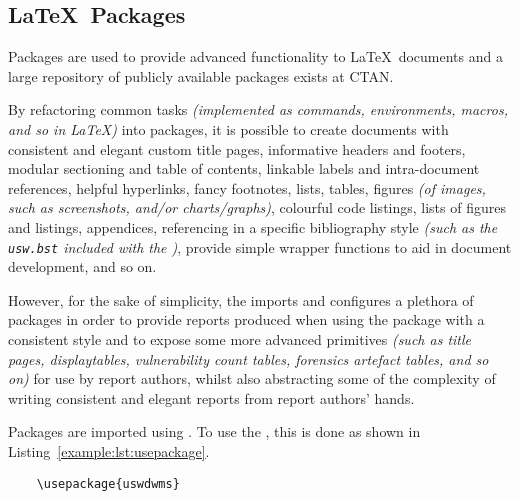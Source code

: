 \subsection{\LaTeX\ Packages}
Packages are used to provide advanced functionality to \LaTeX\ documents and a large repository of publicly available packages exists at CTAN.

By refactoring common tasks \textit{(implemented as commands, environments, macros, and so in \LaTeX{})} into packages, it is possible to create documents with consistent and elegant custom title pages, informative headers and footers, modular sectioning and table of contents, linkable labels and intra-document references, helpful hyperlinks, fancy footnotes, lists, tables, figures \textit{(of images, such as screenshots, and/or charts/graphs)}, colourful code listings, lists of figures and listings, appendices, referencing in a specific bibliography style \textit{(such as the \texttt{usw.bst} included with the \uswdwmspkg{})}, provide simple wrapper functions to aid in document development, and so on.

However, for the sake of simplicity, the \uswdwmspkg{} imports and configures a plethora of packages in order to provide reports produced when using the package with a consistent style and to expose some more advanced primitives \textit{(such as title pages, displaytables, vulnerability count tables, forensics artefact tables, and so on)} for use by report authors, whilst also abstracting some of the complexity of writing consistent and elegant reports from report authors' hands.

Packages are imported using . To use the \uswdwmspkg{}, this is done as shown in Listing~\ref{example:lst:usepackage}.


\begin{listing}[H]
  \captionsetup{skip=\skiplistingcaptionlen}
  \begin{verbatim}
    \usepackage{uswdwms}
  \end{verbatim}
  \caption{\LaTeX\ \texttt{\textbackslash usepackage} command example}
  \label{example:lst:usepackage}
\end{listing}
